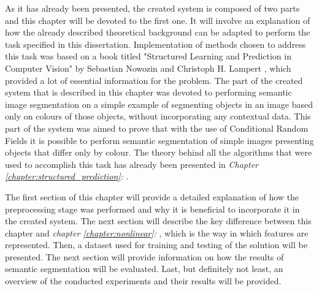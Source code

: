 As it has already been presented, the created system is composed of two parts and this chapter will be devoted to the first one. It will involve an explanation of how the already described theoretical background can be adapted to perform the task specified in this dissertation. Implementation of methods chosen to address this task was based on a book titled "Structured Learning and Prediction in Computer Vision" by Sebastian Nowozin and Christoph H. Lampert \cite{Nowozin}, which provided a lot of essential information for the problem. The part of the created system that is described in this chapter was devoted to performing semantic image segmentation on a simple example of segmenting objects in an image based only on colours of those objects, without incorporating any contextual data. This part of the system was aimed to prove that with the use of Conditional Random Fields it is possible to perform semantic segmentation of simple images presenting objects that differ only by colour. The theory behind all the algorithms that were used to accomplish this task has already been presented in \textit{Chapter \ref{chapter:structured_prediction}: }.

The first section of this chapter will provide a detailed explanation of how the preprocessing stage was performed and why it is beneficial to incorporate it in the created system. The next section will describe the key difference between this chapter and \textit{chapter \ref{chapter:nonlinear}: }, which is the way in which features are represented. Then, a dataset used for training and testing of the solution will be presented. The next section will provide information on how the results of semantic segmentation will be evaluated. Last, but definitely not least, an overview of the conducted experiments and their results will be provided.
